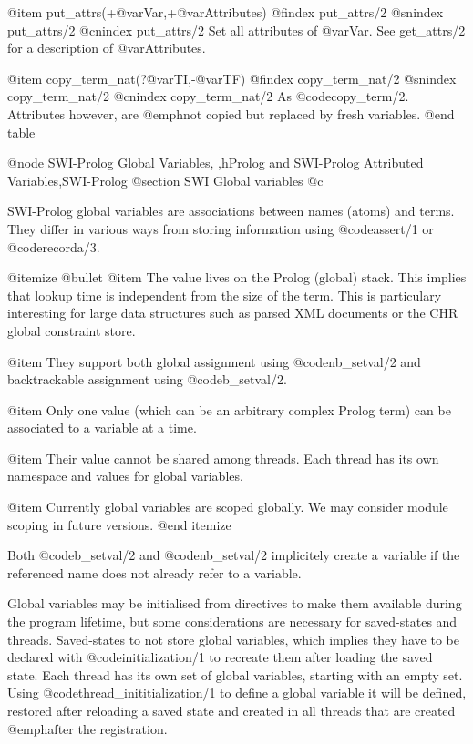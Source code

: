 @item put_attrs(+@var{Var},+@var{Attributes})
@findex put_attrs/2
@snindex put_attrs/2
@cnindex put_attrs/2
Set all attributes of @var{Var}.  See get_attrs/2 for a description of
@var{Attributes}.

@item copy_term_nat(?@var{TI},-@var{TF})
@findex copy_term_nat/2
@snindex copy_term_nat/2
@cnindex copy_term_nat/2
As @code{copy_term/2}.  Attributes however, are @emph{not} copied but replaced
by fresh variables.
@end table


@node SWI-Prolog Global Variables,  ,hProlog and SWI-Prolog Attributed Variables,SWI-Prolog
@section SWI Global variables
@c		\label{sec:gvar}

SWI-Prolog global variables are associations between names (atoms) and
terms.  They differ in various ways from storing information using
@code{assert/1} or @code{recorda/3}.

@itemize @bullet
@item The value lives on the Prolog (global) stack.  This implies 
          that lookup time is independent from the size of the term.
	  This is particulary interesting for large data structures
	  such as parsed XML documents or the CHR global constraint
	  store.

@item They support both global assignment using @code{nb_setval/2} and
          backtrackable assignment using @code{b_setval/2}.

@item Only one value (which can be an arbitrary complex Prolog
   	  term) can be associated to a variable at a time.

@item Their value cannot be shared among threads.  Each thread
          has its own namespace and values for global variables.

@item Currently global variables are scoped globally.  We may
          consider module scoping in future versions.
@end itemize

Both @code{b_setval/2} and @code{nb_setval/2} implicitely create a variable if the
referenced name does not already refer to a variable.

Global variables may be initialised from directives to make them
available during the program lifetime, but some considerations are
necessary for saved-states and threads. Saved-states to not store global
variables, which implies they have to be declared with @code{initialization/1}
to recreate them after loading the saved state.  Each thread has
its own set of global variables, starting with an empty set.  Using
@code{thread_inititialization/1} to define a global variable it will be
defined, restored after reloading a saved state and created in all
threads that are created @emph{after} the registration.


